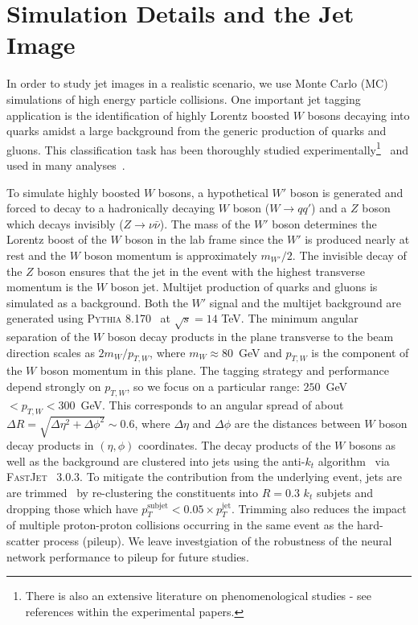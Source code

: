 \section{Simulation Details and the Jet Image}
\label{sec:simulation}

In order to study jet images in a realistic scenario, we use Monte Carlo (MC) simulations of high energy particle collisions. One important jet tagging application is the identification of highly Lorentz boosted $W$ bosons decaying into quarks amidst a large background from the generic production of quarks and gluons.  This classification task has been thoroughly studied experimentally\footnote{There is also an extensive literature on phenomenological studies - see references within the experimental papers.}~\cite{Khachatryan:2014vla,ATL-PHYS-PUB-2015-033,ATL-PHYS-PUB-2014-004} and used in many analyses~\cite{Aad:2015owa,Khachatryan:2014hpa,Khachatryan:2015mta,Khachatryan:2015oba,Khachatryan:2015gza,Khachatryan:2015bma,Khachatryan:2015cwa,Khachatryan:2015ywa,Aad:2014wea,Aad:2015agg,Aad:2015kna,Aad:2015ufa,Aad:2014haa}.  

To simulate highly boosted $W$ bosons, a hypothetical $W'$ boson is generated and forced to decay to a hadronically decaying $W$ boson ($W\rightarrow qq'$) and a $Z$ boson which decays invisibly ($Z\rightarrow \nu\bar{\nu}$).  The mass of the $W'$ boson determines the Lorentz boost of the $W$ boson in the lab frame since the $W'$ is produced nearly at rest and the $W$ boson momentum is approximately $m_{W'}/2$.  The invisible decay of the $Z$ boson ensures that the jet in the event with the highest transverse momentum is the $W$ boson jet.  Multijet production of quarks and gluons is simulated as a background.  Both the $W'$ signal and the multijet background are generated using \textsc{Pythia} 8.170~\cite{Pythia8,Pythia} at $\sqrt{s}=14$ TeV.  The minimum angular separation of the $W$ boson decay products in the plane transverse to the beam direction scales as $2m_{W}/p_{T,W}$, where $m_W\approx 80$~GeV and $p_{T,W}$ is the component of the $W$ boson momentum in this plane.  The tagging strategy and performance depend strongly on $p_{T,W}$, so we focus on a particular range: $250$~GeV~$<p_{T,W}<300$~GeV.  This corresponds to an angular spread of about $\Delta R = \sqrt{ \Delta \eta^2 + \Delta \phi^2} \sim 0.6$, where $\Delta \eta$ and $\Delta \phi$ are the distances between $W$ boson decay products in $(\eta, \phi)$ coordinates.  The decay products of the $W$ bosons as well as the background are clustered into jets using the anti-$k_t$ algorithm~\cite{antiktpaper} via \textsc{FastJet}~\cite{fastjet} 3.0.3.  To mitigate the contribution from the underlying event, jets are are trimmed~\cite{trimming} by re-clustering the constituents into $R=0.3$ $k_t$ subjets and dropping those which have $p_T^\text{subjet}<0.05\times p_T^\text{jet}$.  Trimming also reduces the impact of multiple proton-proton collisions occurring in the same event as the hard-scatter process (pileup).  We leave investgiation of the robustness of the neural network performance to pileup for future studies.

